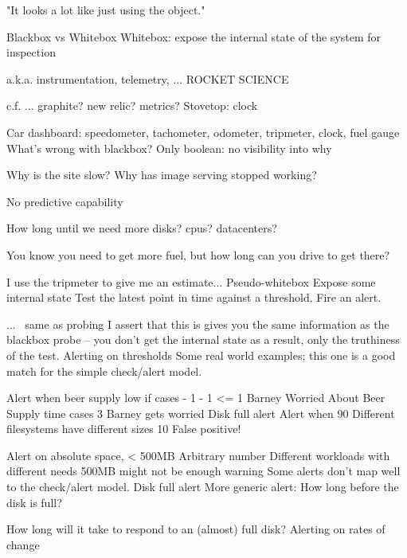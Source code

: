 \documentclass[online,12pt,helvetica]{chaksem}
\begin{document}
"It looks a lot like just using the object."   

Blackbox vs Whitebox
Whitebox: expose the internal state of the system for inspection

a.k.a. instrumentation, telemetry,
... ROCKET SCIENCE

c.f. ... graphite? new relic? metrics?
Stovetop: clock                                                                                                                             
                                                                                                                                                               
Car dashboard: speedometer, tachometer, odometer, tripmeter, clock, fuel gauge
What's wrong with blackbox?
Only boolean: no visibility into why

Why is the site slow?
Why has image serving stopped working?

No predictive capability

How long until we need more disks? cpus? datacenters?

You know you need to get more fuel, but how long can you drive to get there?

I use the tripmeter to give me an estimate...
Pseudo-whitebox
Expose some internal state
Test the latest point in time against a threshold.
Fire an alert.



... ~same as probing
I assert that this is gives you the same information as the blackbox probe -- you don't get the internal state as a result, only the truthiness of the test.
Alerting on thresholds
Some real world examples; this one is a good match for the simple check/alert model.


Alert when beer supply low
if cases - 1 - 1 <= 1
   Barney Worried About Beer Supply
time
cases
3
Barney gets worried
Disk full alert
Alert when 90%
Different filesystems have different sizes
10%
False positive! 

Alert on absolute space, < 500MB
Arbitrary number
Different workloads with different needs 500MB might not be enough warning
Some alerts don't map well to the check/alert model.
Disk full alert
More generic alert:
How long before the disk is full?

How long will it take to respond to an (almost) full disk?
Alerting on rates of change 
\end{document}
